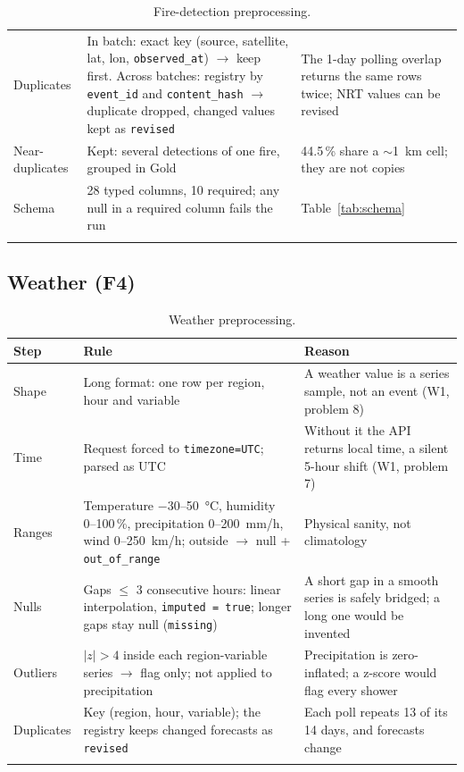 \documentclass[11pt,a4paper]{article}
\newcommand{\code}[1]{\texttt{\small #1}}
\begin{document}
\begin{longtable}{L{2.6cm}L{5.6cm}L{6.3cm}}
Duplicates & In batch: exact key (source, satellite, lat, lon, \code{observed\_at}) $\rightarrow$ keep first. Across batches: registry by \code{event\_id} and \code{content\_hash} $\rightarrow$ duplicate dropped, changed values kept as \code{revised} & The 1-day polling overlap returns the same rows twice; NRT values can be revised \\
Near-duplicates & Kept: several detections of one fire, grouped in Gold & 44.5\,\% share a $\sim$1~km cell; they are not copies \\
Schema & 28 typed columns, 10 required; any null in a required column fails the run & Table~\ref{tab:schema} \\
\bottomrule
\caption{Fire-detection preprocessing.}
\end{longtable}

\subsection{Weather (F4)}

\begin{longtable}{L{2.6cm}L{6.2cm}L{5.7cm}}
\toprule
\textbf{Step} & \textbf{Rule} & \textbf{Reason} \\
\midrule
\endhead
Shape & Long format: one row per region, hour and variable & A weather value is a series sample, not an event (W1, problem 8) \\
Time & Request forced to \code{timezone=UTC}; parsed as UTC & Without it the API returns local time, a silent 5-hour shift (W1, problem 7) \\
Ranges & Temperature $-30$--50~°C, humidity 0--100\,\%, precipitation 0--200~mm/h, wind 0--250~km/h; outside $\rightarrow$ null + \code{out\_of\_range} & Physical sanity, not climatology \\
Nulls & Gaps $\le$ 3 consecutive hours: linear interpolation, \code{imputed = true}; longer gaps stay null (\code{missing}) & A short gap in a smooth series is safely bridged; a long one would be invented \\
Outliers & $|z| > 4$ inside each region-variable series $\rightarrow$ flag only; not applied to precipitation & Precipitation is zero-inflated; a z-score would flag every shower \\
Duplicates & Key (region, hour, variable); the registry keeps changed forecasts as \code{revised} & Each poll repeats 13 of its 14 days, and forecasts change \\
\bottomrule
\caption{Weather preprocessing.}
\end{longtable}
\end{document}
